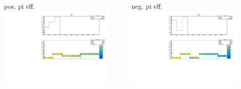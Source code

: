 \documentclass[aspectratio=169,xcolor=dvipsnames]{beamer}
\begin{document}
\begin{frame}
  \begin{columns}
    \begin{column}[T]{0.5\textwidth}
      pos. pi eff.
      \includegraphics[width = 0.9\textwidth]{results/pid/SHMS_pi_eff_6194.pdf}
\end{column}
\begin{column}[T]{0.5\textwidth}
  neg. pi eff.
  \includegraphics[width = 0.9\textwidth]{results/pid/SHMS_pi_eff_6245.pdf}
\end{column}
\end{columns}
\end{frame}
\end{document}
